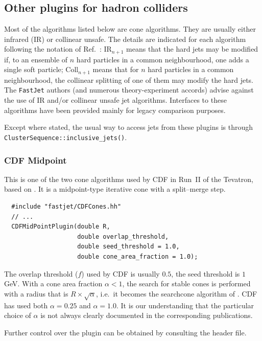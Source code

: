 \documentclass[12pt,a4]{article}
\newcommand{\fastjet}{\texttt{FastJet}\xspace}
\newcommand{\ttt}[1]{{\small\texttt{#1}}}
\begin{document}
\subsection{Other plugins for hadron colliders }
\label{sec:other-pp-plugins}

Most of the algorithms listed below are cone algorithms. 
%
They are usually either infrared (IR) or collinear unsafe.
%
The details are indicated for each algorithm following the
notation of Ref.~\cite{Salam:2009jx}: IR$_{n+1}$ means 
that the hard jets may be modified if, to an ensemble of $n$ hard
particles in a common neighbourhood, one adds a single soft particle;
Coll$_{n+1}$ means that for $n$ hard particles in a common
neighbourhood, the collinear splitting of one of them may modify the
hard jets.
%
The \fastjet authors (and numerous theory-experiment accords) advise
against the use of IR and/or collinear unsafe jet algorithms.  Interfaces to
these algorithms have been provided mainly for legacy comparison
purposes.

Except where stated, the usual way to access jets from these plugins
is through \ttt{ClusterSequence::inclusive\_jets()}.



\subsubsection{CDF Midpoint} 
%
This is one of the two cone algorithms used by CDF in Run~II of the Tevatron, based
on \cite{RunII-jet-physics}. It is a midpoint-type iterative cone with
a split--merge step.
%
\begin{lstlisting}
  #include "fastjet/CDFCones.hh"
  // ...
  CDFMidPointPlugin(double R, 
                    double overlap_threshold,
                    double seed_threshold = 1.0, 
                    double cone_area_fraction = 1.0);
\end{lstlisting}
The overlap threshold ($f$) used by CDF is usually $0.5$, the seed
threshold is $1$\,GeV. 
%
With a cone area fraction $\alpha < 1$, the search for stable
cones is performed with a radius that is $R \times
\sqrt{\alpha}$, i.e.\ it becomes the searchcone
algorithm of \cite{EHT}.
%
CDF has used both $\alpha = 0.25$ and $\alpha = 1.0$.
%
It is our understanding that the particular choice of $\alpha$ is not
always clearly documented in the corresponding publications.

Further control over the plugin can be obtained by consulting the
header file.
\end{document}
